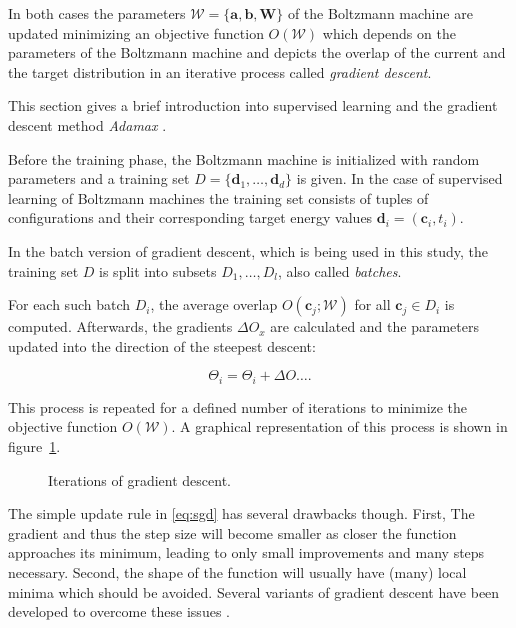 In both cases the parameters $\mathcal{W} = \{\bm{a},\bm{b},\bm{W}\}$ of the Boltzmann machine are updated minimizing 
an objective function $O(\mathcal{W})$ which depends on the parameters of the Boltzmann machine and 
depicts the overlap of the current and the target distribution in an iterative process called 
\textit{gradient descent}.

This section gives a brief introduction into supervised learning and the gradient descent method \textit{Adamax} \cite{kingma2014adam}.

Before the training phase, the Boltzmann machine is initialized with random parameters and a training set 
$D=\{\bm{d}_1,\dots,\bm{d}_d\}$ is given. In the case of supervised learning of Boltzmann machines the training set consists of tuples 
of configurations and their corresponding target energy values $\bm{d}_i= (\bm{c}_i, t_i)$.

In the batch version of gradient descent, which is being used in this study, the training set $D$ is 
split into subsets $D_1, \dots, D_l$, also called \textit{batches}.

For each such batch $D_i$, the average overlap $O(\bm{c}_j; \mathcal{W})$ for all $\bm{c}_j \in D_i$
is computed. Afterwards, the gradients $\Delta O_{x}$ are calculated and the parameters updated into
the direction of the steepest descent:

\begin{equation}
    \label{eq:sgd}
    \Theta_i = \Theta_i + \Delta O \dots.
\end{equation}

This process is repeated for a defined number of iterations to minimize the objective function $O(\mathcal{W})$.
A graphical representation of this process is shown in figure~\ref{fig:sgd}.

\begin{figure}[H]
    \label{fig:sgd}
    \centering
    \caption{Iterations of gradient descent.} 
\end{figure}

The simple update rule in \ref{eq:sgd} has several drawbacks though. First, The gradient and thus the step size will become smaller as 
closer the function approaches its minimum, leading to only small improvements and many steps necessary.
Second, the shape of the function will usually have (many) local minima which should be avoided.
Several variants of gradient descent have been developed to overcome these issues \cite{ruder2016overview}.

